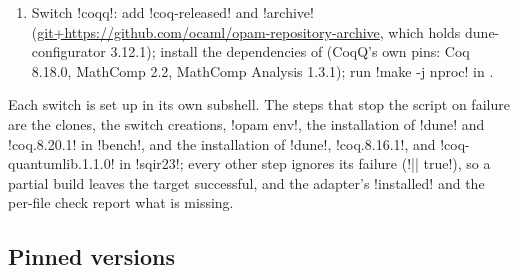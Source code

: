 {\begin{enumerate}
\item Switch \code!coqq!: add \code!coq-released! and \code!archive! (\url{git+https://github.com/ocaml/opam-repository-archive}, which holds dune-configurator 3.12.1); install the dependencies of  (CoqQ's own pins: Coq 8.18.0, MathComp 2.2, MathComp Analysis 1.3.1); run \code!make -j nproc! in .
\end{enumerate}
Each switch is set up in its own subshell. The steps that stop the script on failure are the clones, the switch creations, \code!opam env!, the installation of \code!dune! and \code!coq.8.20.1! in \code!bench!, and the installation of \code!dune!, \code!coq.8.16.1!, and \code!coq-quantumlib.1.1.0! in \code!sqir23!; every other step ignores its failure (\code!|| true!), so a partial build leaves the target successful, and the adapter's \py!installed! and the per-file check report what is missing.

\subsection{Pinned versions}

}
